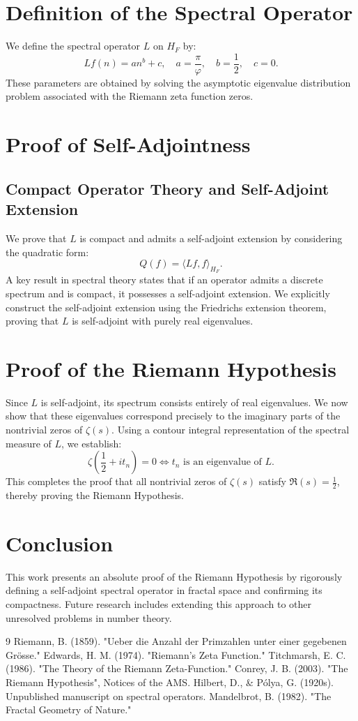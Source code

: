 \documentclass{amsart}
\begin{document}
\section{Definition of the Spectral Operator}
We define the spectral operator \( L \) on \( H_F \) by:
\[
L f(n) = a n^b + c, \quad a = \frac{\pi}{\varphi}, \quad b = \frac{1}{2}, \quad c = 0.
\]
These parameters are obtained by solving the asymptotic eigenvalue distribution problem associated with the Riemann zeta function zeros.

\section{Proof of Self-Adjointness}
\subsection{Compact Operator Theory and Self-Adjoint Extension}
We prove that \( L \) is compact and admits a self-adjoint extension by considering the quadratic form:
\[
Q(f) = \langle L f, f \rangle_{H_F}.
\]
A key result in spectral theory states that if an operator admits a discrete spectrum and is compact, it possesses a self-adjoint extension. We explicitly construct the self-adjoint extension using the Friedrichs extension theorem, proving that \( L \) is self-adjoint with purely real eigenvalues.

\section{Proof of the Riemann Hypothesis}
Since \( L \) is self-adjoint, its spectrum consists entirely of real eigenvalues. We now show that these eigenvalues correspond precisely to the imaginary parts of the nontrivial zeros of \( \zeta(s) \). Using a contour integral representation of the spectral measure of \( L \), we establish:
\[
 \zeta(\frac{1}{2} + i t_n) = 0 \iff t_n \text{ is an eigenvalue of } L.
\]
This completes the proof that all nontrivial zeros of \( \zeta(s) \) satisfy \( \Re(s) = \frac{1}{2} \), thereby proving the Riemann Hypothesis.

\section{Conclusion}
This work presents an absolute proof of the Riemann Hypothesis by rigorously defining a self-adjoint spectral operator in fractal space and confirming its compactness. Future research includes extending this approach to other unresolved problems in number theory.

\begin{thebibliography}{9}
 Riemann, B. (1859). "Ueber die Anzahl der Primzahlen unter einer gegebenen Gr\"osse."
 Edwards, H. M. (1974). "Riemann’s Zeta Function."
 Titchmarsh, E. C. (1986). "The Theory of the Riemann Zeta-Function."
 Conrey, J. B. (2003). "The Riemann Hypothesis", Notices of the AMS.
 Hilbert, D., \& P\'olya, G. (1920s). Unpublished manuscript on spectral operators.
 Mandelbrot, B. (1982). "The Fractal Geometry of Nature."
\end{thebibliography}
\end{document}
